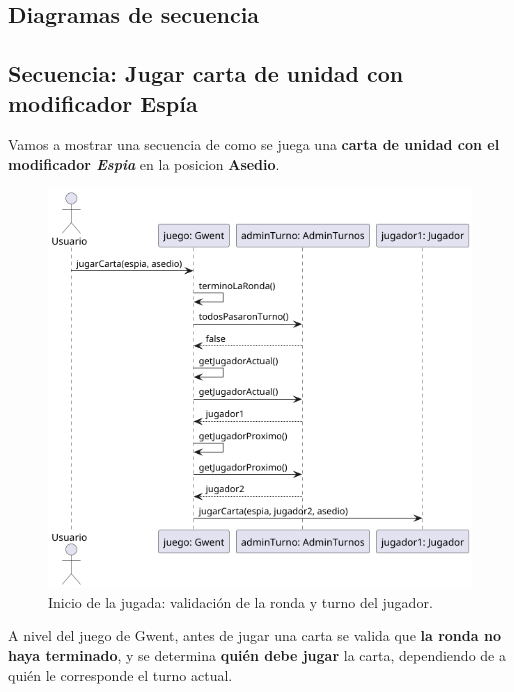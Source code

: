 \documentclass[titlepage,a4paper]{article}
\begin{document}
	\subsection{Diagramas de secuencia}\label{sec:diagramasdesecuencia}

	\subsection{Secuencia: Jugar carta de unidad con modificador Espía}
	Vamos a mostrar una secuencia de como se juega una \textbf{carta de unidad con el modificador \textit{Espia}} en la posicion \textbf{Asedio}.

	\begin{figure}[H]
		\centering
		\includegraphics[width=1\textwidth]{diagramas/secuencia/jugarCarta1}
		\caption{\label{fig:secuencia01} Inicio de la jugada: validación de la ronda y turno del jugador.}
	\end{figure}
	A nivel del juego de Gwent, antes de jugar una carta se valida que \textbf{la ronda no haya terminado}, y se determina \textbf{quién debe jugar} la carta, dependiendo de a quién le corresponde el turno actual.
\end{document}
